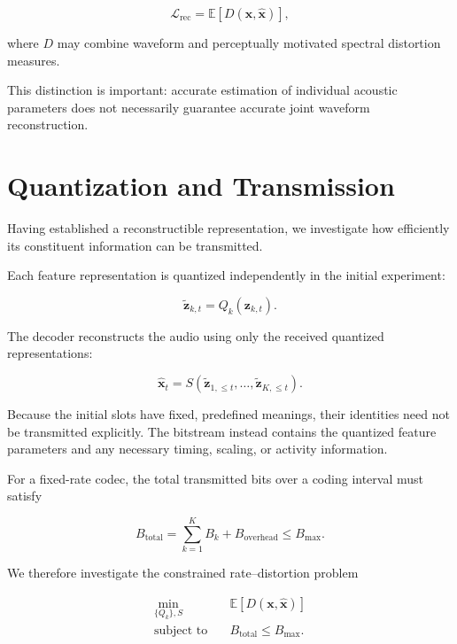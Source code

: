 \documentclass{article}
\begin{document}
\begin{equation}
    \mathcal{L}_{\mathrm{rec}}
    =
    \mathbb{E}
    \left[
    D\left(
    \mathbf{x},
    \hat{\mathbf{x}}
    \right)
    \right],
\end{equation}

where $D$ may combine waveform and perceptually
motivated spectral distortion measures.

This distinction is important: accurate estimation
of individual acoustic parameters does not necessarily
guarantee accurate joint waveform reconstruction.

\section{Quantization and Transmission}

Having established a reconstructible representation,
we investigate how efficiently its constituent
information can be transmitted.

Each feature representation is quantized independently
in the initial experiment:

\begin{equation}
    \tilde{\mathbf{z}}_{k,t}
    =
    Q_k(\mathbf{z}_{k,t}).
\end{equation}

The decoder reconstructs the audio using only the
received quantized representations:

\begin{equation}
    \boxed{
    \hat{\mathbf{x}}_t
    =
    S(\tilde{\mathbf{z}}_{1,\leq t},
      \ldots,
      \tilde{\mathbf{z}}_{K,\leq t}).
    }
\end{equation}

Because the initial slots have fixed, predefined
meanings, their identities need not be transmitted
explicitly. The bitstream instead contains the
quantized feature parameters and any necessary
timing, scaling, or activity information.

For a fixed-rate codec, the total transmitted bits
over a coding interval must satisfy

\begin{equation}
    \boxed{
    B_{\mathrm{total}}
    =
    \sum_{k=1}^{K} B_k
    +
    B_{\mathrm{overhead}}
    \leq B_{\max}.
    }
\end{equation}

We therefore investigate the constrained
rate--distortion problem

\begin{equation}
    \boxed{
    \begin{aligned}
    \min_{\{Q_k\},S}\quad&
    \mathbb{E}[D(\mathbf{x},\hat{\mathbf{x}})]
    \\
    \text{subject to}\quad&
    B_{\mathrm{total}}\leq B_{\max}.
    \end{aligned}
    }
\end{equation}
\end{document}
